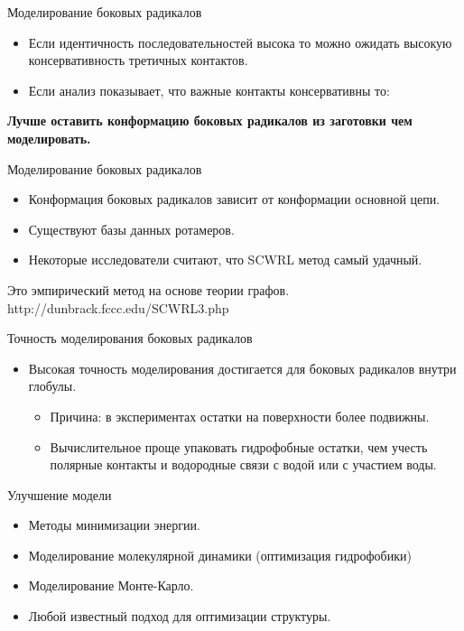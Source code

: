\begin{frame}
{Моделирование боковых радикалов}
	\begin{itemize}
		\item
			 Если идентичность последовательностей высока то можно ожидать высокую консервативность третичных контактов. 
		 \item
			  Если анализ показывает, что важные контакты консервативны то:
	\end{itemize}
	\vspace{.1cm}
	\textbf{
		Лучше оставить конформацию боковых радикалов  из заготовки чем моделировать.}
\end{frame}
\begin{frame}
{Моделирование боковых радикалов}
	\begin{itemize}
		\item
			 Конформация боковых радикалов зависит от конформации основной цепи.
		 \item
			 Существуют базы данных  ротамеров.
		 \item
			 Некоторые исследователи считают, что SCWRL метод самый удачный. 
	\end{itemize}
	\hspace{2.0cm}Это эмпирический метод  на основе теории графов. \\
	\hspace{2.0cm}\color{blue!50!white}http://dunbrack.fccc.edu/SCWRL3.php
	\color{black}
\end{frame}
\begin{frame}
{Точность моделирования боковых радикалов}
	\begin{itemize}
		\item
			 Высокая точность моделирования достигается для боковых радикалов внутри глобулы.
			 \begin{itemize}
		 \item
			 Причина: в экспериментах остатки на поверхности более подвижны.
		 \item
			 Вычислительное проще упаковать гидрофобные остатки, чем учесть полярные контакты и водородные связи с водой или с участием воды.
			 \end{itemize}
	\end{itemize}
\end{frame}
\begin{frame}
{Улучшение модели}
	\begin{itemize}
		\item
			 Методы минимизации энергии.
		 \item
			 Моделирование молекулярной динамики (оптимизация гидрофобики)
		 \item
			 Моделирование Монте-Карло.
		 \item
			 Любой известный подход для оптимизации структуры.
	\end{itemize}
\end{frame}

